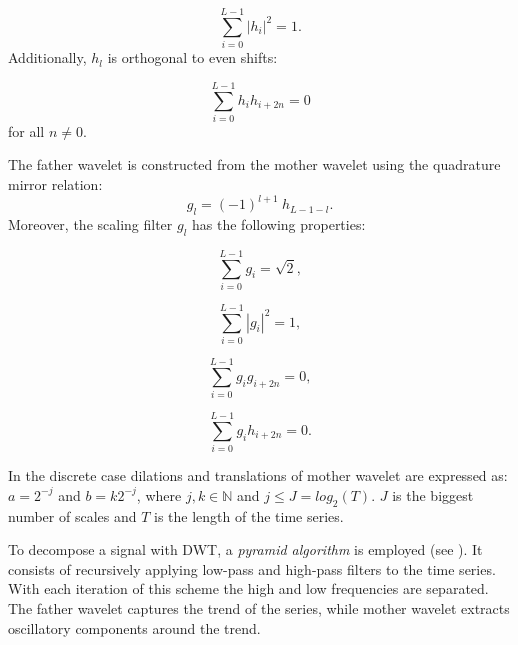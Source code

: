\begin{equation}
	\sum_{i=0}^{L-1} |h_i|^2 = 1.
\end{equation}
Additionally, $h_l$ is orthogonal to even shifts:

\begin{equation}
	\sum_{i=0}^{L-1} h_i h_{i+2n} = 0
\end{equation}
for all $n \neq 0$.

The father wavelet is constructed from the mother wavelet using the quadrature mirror relation:
\begin{equation}
	g_l = (-1)^{l+1} \:  h_{L-1-l}.
\end{equation}
Moreover, the scaling filter $g_l$ has the following properties:
\begin{center}
\noindent
\begin{minipage}[t]{\minipagewidth}
\begin{equation}
	\sum_{i=0}^{L-1} g_i = \sqrt{2},
\end{equation}
\end{minipage}
\begin{minipage}[t]{\minipagewidth}
\begin{equation}
	\sum_{i=0}^{L-1} |g_i|^2 = 1,
\end{equation}
\end{minipage}

\begin{minipage}[t]{\minipagewidth}
\begin{equation}
	\sum_{i=0}^{L-1} g_i g_{i+2n} = 0,
\end{equation}
\end{minipage}
\begin{minipage}[t]{\minipagewidth}
\begin{equation}
	\sum_{i=0}^{L-1} g_i h_{i+2n} = 0.
\end{equation}
\end{minipage}
\end{center}

In the discrete case dilations and translations of mother wavelet are expressed as:
$a=2^{-j}$ and $b=k 2^{-j}$, where $j, k \in \mathbb{N}$ and $j \leq J = log_2(T)$.
$J$ is the biggest number of scales and $T$ is the length of the time series.

To decompose a signal with DWT, a \emph{pyramid algorithm} is employed (see ).
It consists of recursively applying low-pass and high-pass filters to the time series.
With each iteration of this scheme the high and low frequencies are separated.
The father wavelet captures the trend of the series, while mother wavelet extracts oscillatory components around the trend.

